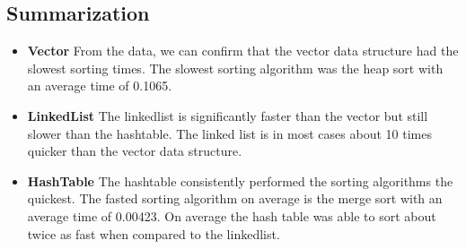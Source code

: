\documentclass[12pt]{article}
\begin{document}
\subsection*{Summarization}

\begin{itemize}
	\item \textbf{Vector} From the data, we can confirm that the vector data structure had the slowest sorting times. The slowest sorting algorithm was the heap sort with an average time of 0.1065.
	\item \textbf{LinkedList} The linkedlist is significantly faster than the vector but still slower than the hashtable. The linked list is in most cases about 10 times quicker than the vector data structure.
	\item \textbf{HashTable} The hashtable consistently performed the sorting algorithms the quickest. The fasted sorting algorithm on average is the merge sort with an average time of 0.00423. On average the hash table was able to sort about twice as fast when compared to the linkedlist.
\end{itemize}
\end{document}
